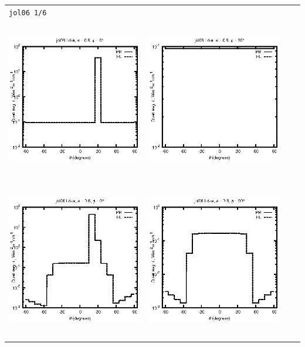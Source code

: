 \begin{tabular}{c c c c}
\multicolumn{4}{l}{\texttt{jol06 1/6}} \\
\includegraphics[height=7cm]{../eps/jol06_Ld_a_fwd.eps} &
\includegraphics[height=7cm]{../eps/jol06_Ld_a_cross.eps}\\
\includegraphics[height=7cm]{../eps/jol06_Ld_w_fwd.eps} &
\includegraphics[height=7cm]{../eps/jol06_Ld_w_cross.eps} \\

\end{tabular}

